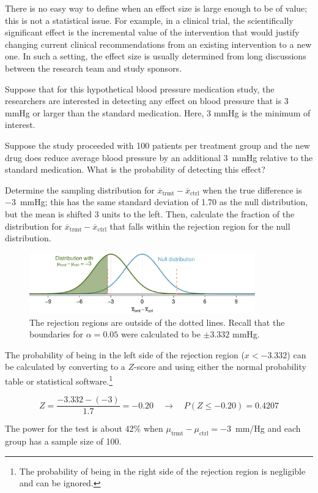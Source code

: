 There is no easy way to define when an effect size is large enough to be of value; this is not a statistical issue. For example, in a clinical trial, the scientifically significant effect is the incremental value of the intervention that would justify changing current clinical recommendations from an existing intervention to a new one. In such a setting, the effect size is usually determined from long discussions between the research team and study sponsors. 

Suppose that for this hypothetical blood pressure medication study, the researchers are interested in detecting any effect on blood pressure that is 3 mmHg or larger than the standard medication. Here, 3 mmHg is the minimum  of interest. 

\begin{example}{Suppose the study proceeded with 100 patients per treatment group and the new drug does reduce average blood pressure by an additional 3~mmHg relative to the standard medication. What is the probability of detecting this effect?}\label{PowerFor100AtNeg3}

Determine the sampling distribution for $\overline{x}_{\text{trmt}} - \overline{x}_{\text{ctrl}}$ when the true difference is $-3$~mmHg; this has the same standard deviation of 1.70 as the null distribution, but the mean is shifted 3 units to the left. Then, calculate the fraction of the distribution for $\overline{x}_{\text{trmt}} - \overline{x}_{\text{ctrl}}$ that falls within the rejection region for the null distribution.

\begin{figure}[h]
\begin{center}
	\includegraphics[width=0.87\textwidth]{ch_inference_for_means_oi_biostat/figures/power_null_0_1-7/power_null_D_0_1-7_with_alt_at_3_and_shaded}
	\caption{The rejection regions are outside of the dotted lines. Recall that the boundaries for $\alpha = 0.05$ were calculated to be $\pm 3.332$ mmHg.}
\end{center}	
\end{figure}

The probability of being in the left side of the rejection region ($x < -3.332$) can be calculated by converting to a $Z$-score and using either the normal probability table or statistical software.\footnote{The probability of being in the right side of the rejection region is negligible and can be ignored.}

\[
	Z = \frac{-3.332 - (-3)}{1.7}= -0.20 \quad \to \quad P(Z \leq -0.20) = 0.4207
\]

The power for the test is about 42\% when $\mu_{\text{trmt}} - \mu_{\text{ctrl}} = -3$~mm/Hg and each group has a sample size of 100.
\end{example}



